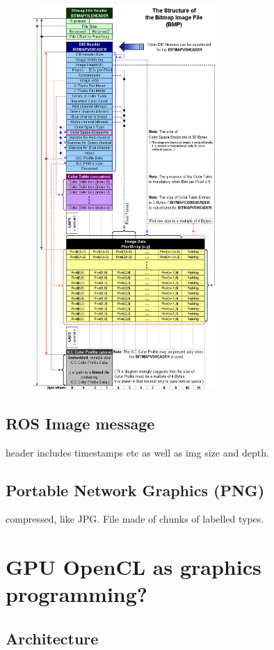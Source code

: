 \documentclass[oneside,english]{scrbook}
\begin{document}
\begin{figure}
	\caption{}
	\includegraphics[width=7cm]{figs/BMPfileFormat}
\end{figure}



\section{ROS Image message}

header includes timestamps etc as well as img size and depth.


\section{Portable Network Graphics (PNG)}

compressed, like JPG. File made of chunks of labelled types.



\chapter{GPU OpenCL as graphics programming?}

\section{Architecture}
\end{document}
